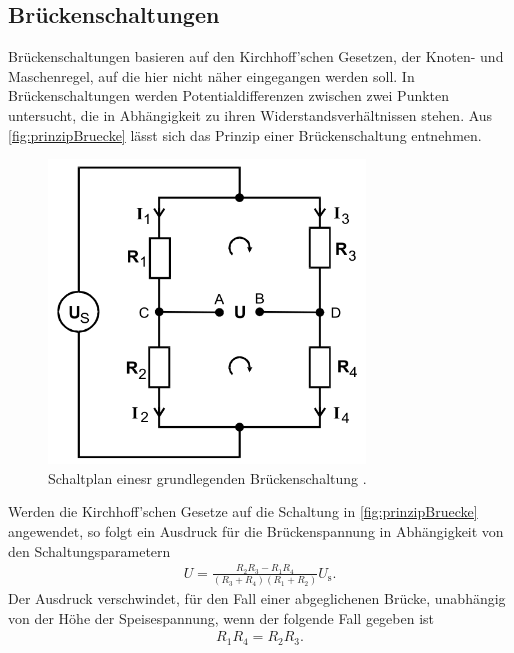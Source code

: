 \subsection{Brückenschaltungen}
Brückenschaltungen basieren auf den Kirchhoff'schen Gesetzen, der Knoten- und Maschenregel, auf die hier nicht näher eingegangen werden soll.
In Brückenschaltungen werden Potentialdifferenzen zwischen zwei Punkten untersucht, die in Abhängigkeit zu ihren Widerstandsverhältnissen
stehen. Aus \autoref{fig:prinzipBruecke} lässt sich das Prinzip einer Brückenschaltung entnehmen.
\begin{figure}[H]
    \centering
    \includegraphics[width=0.75\textwidth]{dateien/PrinzipBrueckenschaltung.png}
    \caption{Schaltplan einesr grundlegenden Brückenschaltung .}
    \label{fig:prinzipBruecke}
\end{figure}
Werden die Kirchhoff'schen Gesetze auf die Schaltung in \autoref{fig:prinzipBruecke} angewendet, so folgt ein Ausdruck
für die Brückenspannung in Abhängigkeit von den Schaltungsparametern
\begin{align*}
    U = \frac{R_2R_3 - R_1R_4}{(R_3+R_4)(R_1+R_2)} U_{\text{s}}  .
\end{align*}
Der Ausdruck verschwindet, für den Fall einer abgeglichenen Brücke, unabhängig von der Höhe der Speisespannung, 
wenn der folgende Fall gegeben ist
\begin{align}
    \label{eqn:abgBr}
    R_1R_4=R_2R_3.
\end{align}


